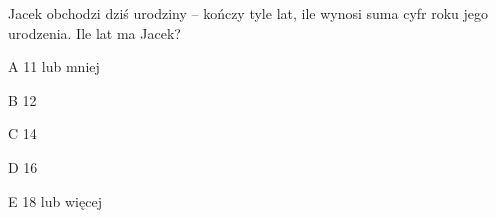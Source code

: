 \begin{tresc}
Jacek obchodzi dziś urodziny – kończy tyle lat, ile wynosi suma cyfr roku jego urodzenia. Ile lat ma Jacek?
\end{tresc}
\begin{wariant}{A} 11 lub mniej \end{wariant}
\begin{wariant}{B} 12 \end{wariant}
\begin{wariant}{C} 14 \end{wariant}
\begin{wariant}{D} 16 \end{wariant}
\begin{wariant}{E} 18 lub więcej \end{wariant}
